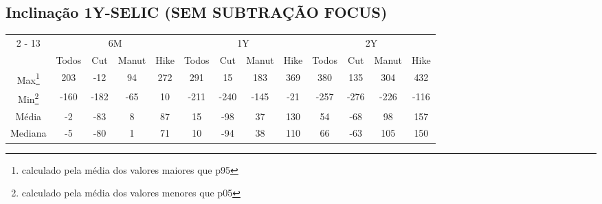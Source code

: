 \documentclass{article}%
\begin{document}
\subsection{Inclinação 1Y{-}SELIC (SEM SUBTRAÇÃO FOCUS)}%
\label{subsec:Inclinao1Y{-}SELIC(SEMSUBTRAOFOCUS)}%
\begin{minipage}{\textwidth}%
\vspace*{0.4in}%
\centering%
\hspace*{-0.3in}%
%
%
\begin{tabular}{c c c c c c c c c c c c c }%
\cline{2%
-%
13}%
&\multicolumn{4}{|c|}{6M}&\multicolumn{4}{c|}{1Y}&\multicolumn{4}{c|}{2Y}\\%
&\multicolumn{1}{|c}{Todos}&\multicolumn{1}{c}{Cut}&\multicolumn{1}{c}{Manut}&\multicolumn{1}{c|}{Hike}&\multicolumn{1}{c}{Todos}&\multicolumn{1}{c}{Cut}&\multicolumn{1}{c}{Manut}&\multicolumn{1}{c|}{Hike}&\multicolumn{1}{c}{Todos}&\multicolumn{1}{c}{Cut}&\multicolumn{1}{c}{Manut}&\multicolumn{1}{c|}{Hike}\\%
\hline%
\multicolumn{1}{|c|}{Max\footnote{calculado pela média dos valores maiores que p95}}&\multicolumn{1}{c}{203}&\multicolumn{1}{c}{{-}12}&\multicolumn{1}{c}{94}&\multicolumn{1}{c|}{272}&\multicolumn{1}{c}{291}&\multicolumn{1}{c}{15}&\multicolumn{1}{c}{183}&\multicolumn{1}{c|}{369}&\multicolumn{1}{c}{380}&\multicolumn{1}{c}{135}&\multicolumn{1}{c}{304}&\multicolumn{1}{c|}{432}\\%
\hline%
\multicolumn{1}{|c|}{Min\footnote{calculado pela média dos valores menores que p05}}&\multicolumn{1}{c}{{-}160}&\multicolumn{1}{c}{{-}182}&\multicolumn{1}{c}{{-}65}&\multicolumn{1}{c|}{10}&\multicolumn{1}{c}{{-}211}&\multicolumn{1}{c}{{-}240}&\multicolumn{1}{c}{{-}145}&\multicolumn{1}{c|}{{-}21}&\multicolumn{1}{c}{{-}257}&\multicolumn{1}{c}{{-}276}&\multicolumn{1}{c}{{-}226}&\multicolumn{1}{c|}{{-}116}\\%
\hline%
\multicolumn{1}{|c|}{Média}&\multicolumn{1}{c}{{-}2}&\multicolumn{1}{c}{{-}83}&\multicolumn{1}{c}{8}&\multicolumn{1}{c|}{87}&\multicolumn{1}{c}{15}&\multicolumn{1}{c}{{-}98}&\multicolumn{1}{c}{37}&\multicolumn{1}{c|}{130}&\multicolumn{1}{c}{54}&\multicolumn{1}{c}{{-}68}&\multicolumn{1}{c}{98}&\multicolumn{1}{c|}{157}\\%
\hline%
\multicolumn{1}{|c|}{Mediana}&\multicolumn{1}{c}{{-}5}&\multicolumn{1}{c}{{-}80}&\multicolumn{1}{c}{1}&\multicolumn{1}{c|}{71}&\multicolumn{1}{c}{10}&\multicolumn{1}{c}{{-}94}&\multicolumn{1}{c}{38}&\multicolumn{1}{c|}{110}&\multicolumn{1}{c}{66}&\multicolumn{1}{c}{{-}63}&\multicolumn{1}{c}{105}&\multicolumn{1}{c|}{150}\\%

\end{tabular}
\end{minipage}
\end{document}
